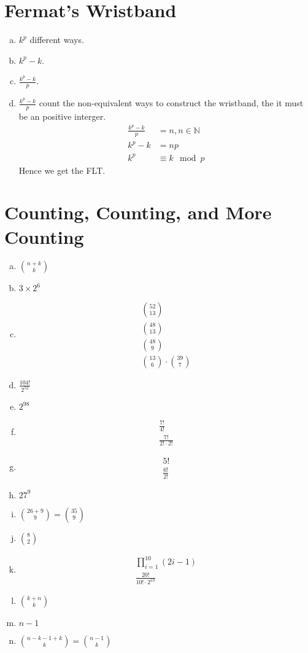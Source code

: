 \documentclass{article}
\begin{document}
\part*{Fermat's Wristband}
\begin{enumerate}[(a)]
    \item $k^p$ different ways.
    \item $k^p - k$.
    \item $\frac{k^p-k}{p}$.
    \item $\frac{k^p-k}{p}$ count the non-equivalent ways to construct the wristband, the it must be an positive interger. \\
    \begin{align*}
        \frac{k^p-k}{p} &= n, n \in \mathbb{N}\\
        k^p - k &= np\\
        k^p &\equiv k \mod{p}
    \end{align*}
    Hence we get the FLT.
\end{enumerate}    

\part*{Counting, Counting, and More Counting}
\begin{enumerate}[(a)]
    \item $\binom{n+k}{k}$
    \item $3 \times 2^6$
    \item \begin{align}
        \binom{52}{13}\\
        \binom{48}{13}\\
        \binom{48}{9}\\
        \binom{13}{6} \cdot \binom{39}{7}
    \end{align}
    \item $\frac{104!}{2^{52}}$
    \item $2^{98}$
    \item \begin{align}
        \frac{7!}{4!}\\
        \frac{7!}{2! \cdot 2!}
    \end{align}
    \item \begin{align}
        5!\\
        \frac{6!}{2!}
    \end{align}
    \item $27^9$
    \item $\binom{26+9}{9} = \binom{35}{9}$
    \item $\binom{8}{2}$
    \item \begin{align}
        \prod_{i=1}^{10}(2i-1) \\
        \frac{20!}{10! \cdot 2^{10}}
    \end{align}
    \item $\binom{k+n}{k}$
    \item $n-1$
    \item $\binom{n-k-1+k}{k} = \binom{n-1}{k}$
\end{enumerate}
\end{document}
